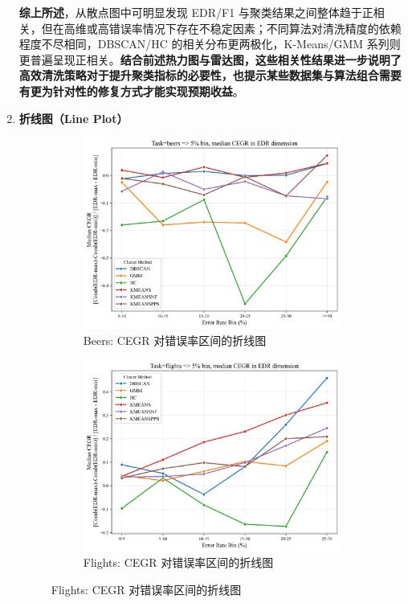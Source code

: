 \documentclass[10pt]{article} %
\numberwithin{equation}{section}
\begin{document}
\begin{enumerate}[label=(\alph*)]
\noindent
\textbf{综上所述}，从散点图中可明显发现 EDR/F1 与聚类结果之间整体趋于正相关，但在高维或高错误率情况下存在不稳定因素；不同算法对清洗精度的依赖程度不尽相同，DBSCAN/HC 的相关分布更两极化，K-Means/GMM 系列则更普遍呈现正相关。\textbf{结合前述热力图与雷达图，这些相关性结果进一步说明了高效清洗策略对于提升聚类指标的必要性，也提示某些数据集与算法组合需要有更为针对性的修复方式才能实现预期收益}。  

    \item \textbf{折线图（Line Plot）} \\
\begin{figure}[htbp]
    \centering
    \begin{subfigure}[b]{0.45\linewidth}
        \centering
        \includegraphics[width=\linewidth]{figures/line graph/CEGR_5pct_beers.pdf}
        \caption{Beers: CEGR 对错误率区间的折线图}
        \label{fig:cegr_beers}
    \end{subfigure}
    \hfill
    \begin{subfigure}[b]{0.45\linewidth}
        \centering
        \includegraphics[width=\linewidth]{figures/line graph/CEGR_5pct_flights.pdf}
        \caption{Flights: CEGR 对错误率区间的折线图}
        \label{fig:cegr_flights}
    \end{subfigure}
    

\end{figure}
\end{enumerate}
\end{document}
